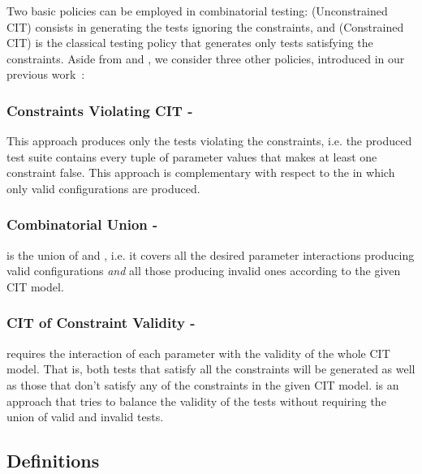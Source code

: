 \begin{tikzborder}{\cite{Gargantini16:validation}}
\begin{tikzborder}{\cite{gargantini_combinatorial_2017}}
\begin{tikzborder}{\cite{gargantini_combinatorial_2017}}
Two basic policies can be employed in combinatorial testing: \ic (Unconstrained CIT) consists in generating the tests ignoring the constraints, and \ccit (Constrained CIT) is the classical testing policy that generates only tests satisfying the constraints. Aside from \ic and \ccit, we consider three other policies, introduced in our previous work~\cite{Gargantini16:validation}:

\subsubsection{Constraints Violating CIT - \cv}
This approach produces only the tests violating the constraints, i.e. the produced test suite contains every tuple of parameter values that makes at least one constraint false. This approach is complementary with respect to the \ccit in which only valid configurations are produced.

\subsubsection{Combinatorial Union - \cucv}
\cucv is the union of \ccit and \cv, i.e. it covers all the desired parameter interactions producing valid configurations \emph{and} all those producing invalid ones according to the given CIT model.

\subsubsection{CIT of Constraint Validity - \ValC}
\ValC requires the interaction of each parameter with the validity of the whole CIT model. That is, both tests that satisfy all the constraints will be generated as well as those that don't satisfy any of the constraints in the given CIT model. \ValC is an approach that tries to balance the validity of the tests without requiring the union of valid and invalid tests.

\be

\subsection{Definitions}
\label{sec:defs}


\end{tikzborder}
\end{tikzborder}
\end{tikzborder}

